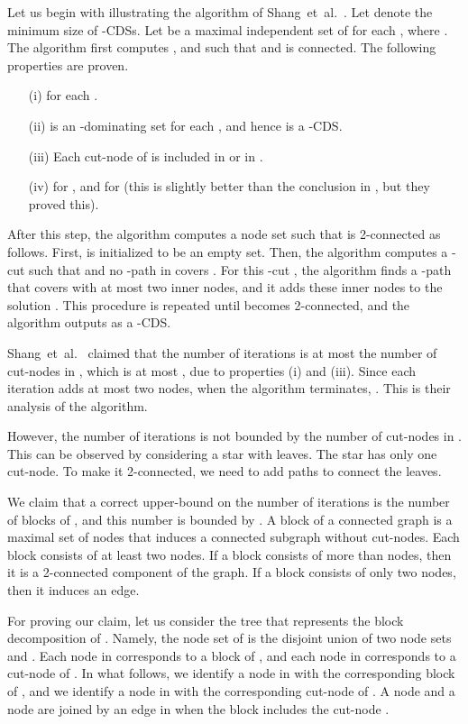 \documentclass[11pt]{article}
\begin{document}
Let us begin with illustrating the algorithm of Shang~et~al.~\cite{Shang:2007jg}.
Let  denote the minimum size of -CDSs.
Let  be a maximal independent set of  for each , where .
The algorithm first computes ,
and  such that  and
 is connected.
The following properties are proven.
 \begin{itemize}
  \item[(i)]  for each .
  \item[(ii)]  is an -dominating set for
	      each ,
	      and hence  is a -CDS.
  \item[(iii)] Each cut-node of  is included in  or in .
  \item[(iv)]  for ,
	      and  for 
	      (this is slightly better than the conclusion in
	      \cite{Shang:2007jg}, but they proved this).
 \end{itemize}

 After this step,
the algorithm computes a
node set  such that  is 2-connected as follows.
First,  is initialized to be an empty set.
Then, the algorithm computes
a -cut  such that 
and no -path in 
covers .
For this -cut ,
the algorithm finds a -path that covers  with at most two inner nodes,
and it adds these inner nodes to the solution .
This procedure is repeated until  becomes 2-connected,
and the algorithm outputs 
as a -CDS.

Shang~et~al.\ \cite{Shang:2007jg} claimed that the number of iterations is at most
the number of cut-nodes in , which is 
at most , due to
properties (i) and (iii).
Since each iteration adds at most two nodes, when the algorithm terminates, 
 .
 This is their analysis of the algorithm.

 However, the number of iterations is not bounded by the number of cut-nodes in .
 This can be observed by considering a star with  leaves.
 The star has only one cut-node. To make it 2-connected,
 we need to add  paths to connect the leaves.

 We claim that a correct upper-bound on the number of iterations
 is the number of blocks of ,
 and this number is bounded by .
 A block of a connected graph is a maximal set of nodes that induces a connected subgraph without cut-nodes.
 Each block consists of at least two nodes.
 If a block consists of more than nodes, then it is a 2-connected component of the graph.
 If a block consists of only two nodes, then it induces an edge.

 For proving our claim, 
  let us consider the tree  that represents the block
  decomposition of .
  Namely, the node set of  is the disjoint union of two node sets 
  and . Each node in  corresponds to a block of
  ,
  and each node in  corresponds to a cut-node of .
  In what follows, we identify a node in  with the corresponding
  block of , and we identify a node in  with the
  corresponding
  cut-node of .
  A node  and a node  are joined by an edge in 
  when the block  includes the cut-node .
\end{document}
